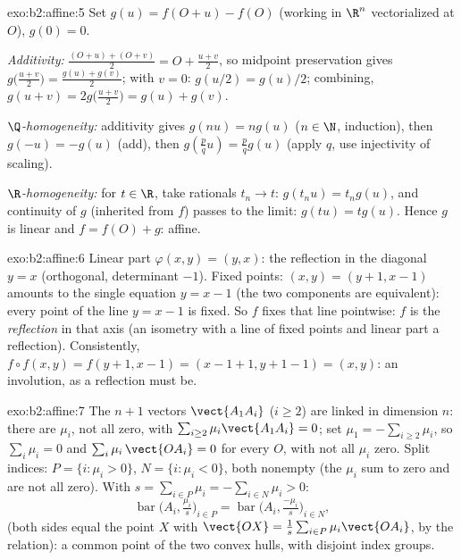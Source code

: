 \begin{solution}{exo:b2:affine:5}
Set $g(u) = f(O + u) - f(O)$ (working in $\R^n$ vectorialized at
$O$), $g(0) = 0$.

\emph{Additivity:} $\frac{(O + u) + (O + v)}{2} = O + \frac{u +
v}{2}$, so midpoint preservation gives $g\bigl(\frac{u+v}{2}\bigr)
= \frac{g(u) + g(v)}{2}$; with $v = 0$: $g(u/2) = g(u)/2$;
combining, $g(u + v) = 2g\bigl(\frac{u+v}{2}\bigr) = g(u) + g(v)$.

\emph{$\Q$-homogeneity:} additivity gives $g(nu) = ng(u)$ ($n \in
\N$, induction), then $g(-u) = -g(u)$ (add), then $g(\frac pq u) =
\frac pq g(u)$ (apply $q$, use injectivity of scaling).

\emph{$\R$-homogeneity:} for $t \in \R$, take rationals $t_n \to
t$: $g(t_nu) = t_ng(u)$, and continuity of $g$ (inherited from $f$)
passes to the limit: $g(tu) = tg(u)$. Hence $g$ is linear and $f =
f(O) + g$: affine.
\end{solution}

\begin{solution}{exo:b2:affine:6}
Linear part $\varphi(x,y) = (y, x)$: the reflection in the diagonal
$y = x$ (orthogonal, determinant $-1$). Fixed points: $(x, y) = (y
+ 1, x - 1)$ amounts to the single equation $y = x - 1$ (the two
components are equivalent): every point of the line $y = x - 1$ is
fixed. So $f$ fixes that line pointwise: $f$
is the \emph{reflection} in that axis (an isometry with a line of
fixed points and linear part a reflection). Consistently, $f \circ
f(x,y) = f(y+1, x-1) = (x - 1 + 1, y + 1 - 1) = (x, y)$: an
involution, as a reflection must be.
\end{solution}

\begin{solution}{exo:b2:affine:7}
The $n + 1$ vectors $\vect{A_1A_i}$ ($i \geq 2$) are linked in
dimension $n$: there are $\mu_i$, not all zero, with $\sum_{i\geq2}
\mu_i\vect{A_1A_i} = 0$; set $\mu_1 = -\sum_{i \geq 2}\mu_i$, so
$\sum_{i}\mu_i = 0$ and $\sum_i \mu_i\,\vect{OA_i} = 0$ for every
$O$, with not all $\mu_i$ zero. Split indices: $P = \{i : \mu_i >
0\}$, $N = \{i : \mu_i < 0\}$, both nonempty (the $\mu_i$ sum to
zero and are not all zero). With $s = \sum_{i\in P}\mu_i =
-\sum_{i \in N}\mu_i > 0$:
\[
\operatorname{bar}\bigl(A_i, \tfrac{\mu_i}{s}\bigr)_{i \in P}
= \operatorname{bar}\bigl(A_i, \tfrac{-\mu_i}{s}\bigr)_{i \in N},
\]
(both sides equal the point $X$ with $\vect{OX} = \frac1s\sum_{i\in
P}\mu_i\vect{OA_i}$, by the relation): a common point of the two
convex hulls, with disjoint index groups.
\end{solution}

